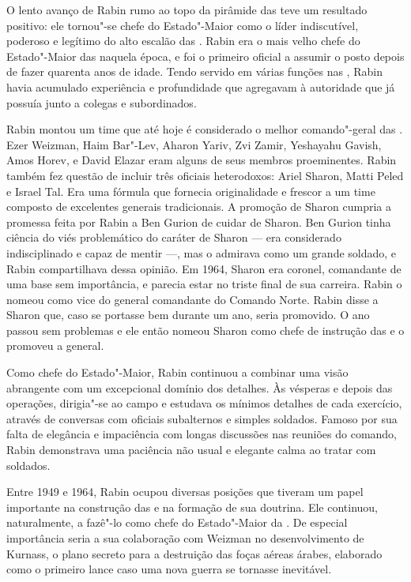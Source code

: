 O lento avanço de Rabin rumo ao topo da pirâmide das  teve um
resultado positivo: ele tornou"-se chefe do Estado"-Maior como o líder
indiscutível, poderoso e legítimo do alto escalão das . Rabin era o
mais velho chefe do Estado"-Maior das  naquela época, e foi o primeiro
oficial a assumir o posto depois de fazer quarenta anos de idade. Tendo servido em várias
funções nas , Rabin havia acumulado experiência e profundidade que
agregavam à autoridade que já possuía junto a colegas e subordinados.

Rabin montou um time que até hoje é considerado o melhor comando"-geral
das . Ezer Weizman, Haim Bar"-Lev, Aharon Yariv, Zvi Zamir, Yeshayahu
Gavish, Amos Horev, e David Elazar eram alguns de seus membros proeminentes. Rabin também fez
questão de incluir três oficiais heterodoxos: Ariel Sharon, Matti Peled
e Israel Tal. Era uma fórmula que fornecia originalidade e frescor a um
time composto de excelentes generais tradicionais. A promoção de Sharon
cumpria a promessa feita por Rabin a Ben Gurion de cuidar de Sharon. Ben
Gurion tinha ciência do viés problemático do caráter de Sharon --- era
considerado indisciplinado e capaz de mentir ---, mas o admirava como um
grande soldado, e Rabin compartilhava dessa opinião. Em 1964,
Sharon era coronel, comandante de uma base sem importância, e parecia
estar no triste final de sua carreira. Rabin o nomeou como vice do
general comandante do Comando Norte. Rabin disse a Sharon que, caso se
portasse bem durante um ano, seria promovido. O ano passou sem problemas e
ele então nomeou Sharon como chefe de instrução das  e o promoveu a
general.

Como chefe do Estado"-Maior, Rabin continuou a combinar uma visão
abrangente com um excepcional domínio dos detalhes. Às vésperas e depois
das operações, dirigia"-se ao campo e estudava os mínimos detalhes de cada
exercício, através de conversas com oficiais subalternos e simples
soldados. Famoso por sua falta de elegância e impaciência com longas
discussões nas reuniões do comando, Rabin demonstrava uma paciência não
usual e elegante calma ao tratar com soldados.

Entre 1949 e 1964, Rabin ocupou diversas posições que tiveram um papel
importante na construção das  e na formação de sua doutrina. Ele
continuou, naturalmente, a fazê"-lo como chefe do Estado"-Maior da . De
especial importância seria a sua colaboração com Weizman no
desenvolvimento de Kurnass, o plano secreto para a destruição das foças
aéreas árabes, elaborado como o primeiro lance caso uma nova guerra se
tornasse inevitável.

